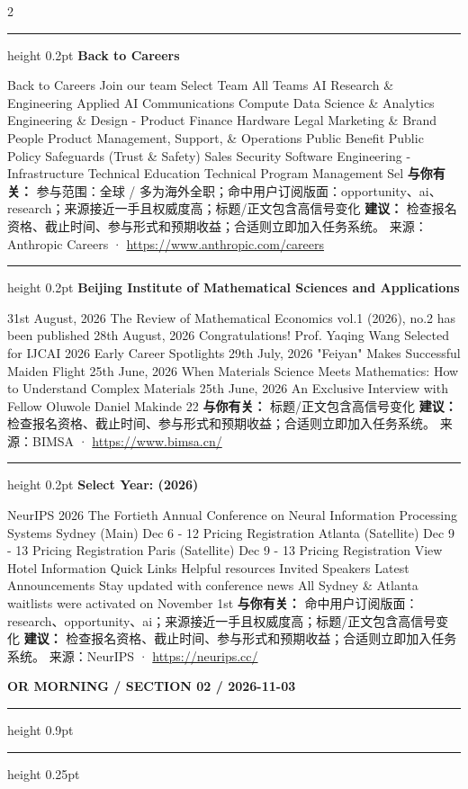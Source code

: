 \documentclass[10.5pt]{ctexart}
\begin{document}
\begin{multicols}{2}
\vspace{2mm}
\hrule height 0.2pt
\vspace{2mm}
{\large\bfseries Back to Careers}\par
Back to Careers Join our team Select Team All Teams AI Research \& Engineering Applied AI Communications Compute Data Science \& Analytics Engineering \& Design - Product Finance Hardware Legal Marketing \& Brand People Product Management, Support, \& Operations Public Benefit Public Policy Safeguards (Trust \& Safety) Sales Security Software Engineering - Infrastructure Technical Education Technical Program Management Sel
\textbf{与你有关：} 参与范围：全球 / 多为海外全职；命中用户订阅版面：opportunity、ai、research；来源接近一手且权威度高；标题/正文包含高信号变化
\textbf{建议：} 检查报名资格、截止时间、参与形式和预期收益；合适则立即加入任务系统。
{\footnotesize\color{ormuted} 来源：Anthropic Careers · \url{https://www.anthropic.com/careers}}
\vspace{2mm}
\hrule height 0.2pt
\vspace{2mm}
{\large\bfseries Beijing Institute of Mathematical Sciences and Applications}\par
31st August, 2026 The Review of Mathematical Economics vol.1 (2026), no.2 has been published 28th August, 2026 Congratulations! Prof. Yaqing Wang Selected for IJCAI 2026 Early Career Spotlights 29th July, 2026 "Feiyan" Makes Successful Maiden Flight 25th June, 2026 When Materials Science Meets Mathematics: How to Understand Complex Materials 25th June, 2026 An Exclusive Interview with Fellow Oluwole Daniel Makinde 22
\textbf{与你有关：} 标题/正文包含高信号变化
\textbf{建议：} 检查报名资格、截止时间、参与形式和预期收益；合适则立即加入任务系统。
{\footnotesize\color{ormuted} 来源：BIMSA · \url{https://www.bimsa.cn/}}
\vspace{2mm}
\hrule height 0.2pt
\vspace{2mm}
{\large\bfseries Select Year: (2026)}\par
NeurIPS 2026 The Fortieth Annual Conference on Neural Information Processing Systems Sydney (Main) Dec 6 - 12 Pricing Registration Atlanta (Satellite) Dec 9 - 13 Pricing Registration Paris (Satellite) Dec 9 - 13 Pricing Registration View Hotel Information Quick Links Helpful resources Invited Speakers Latest Announcements Stay updated with conference news All Sydney \& Atlanta waitlists were activated on November 1st 
\textbf{与你有关：} 命中用户订阅版面：research、opportunity、ai；来源接近一手且权威度高；标题/正文包含高信号变化
\textbf{建议：} 检查报名资格、截止时间、参与形式和预期收益；合适则立即加入任务系统。
{\footnotesize\color{ormuted} 来源：NeurIPS · \url{https://neurips.cc/}}
\end{multicols}
\newpage
{\small\bfseries OR MORNING / SECTION 02 / 2026-11-03}
\vspace{2mm}
\hrule height 0.9pt
\vspace{1.5mm}
\hrule height 0.25pt
\vspace{4mm}
\end{document}
